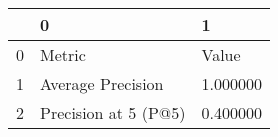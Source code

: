 \begin{tabular}{lll}
\toprule
 & 0 & 1 \\
\midrule
0 & Metric & Value \\
1 & Average Precision & 1.000000 \\
2 & Precision at 5 (P@5) & 0.400000 \\
\bottomrule
\end{tabular}

